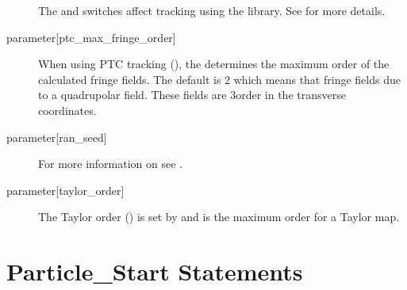 \begin{description}
The  and  switches affect tracking using the 
library. See  for more details.
%
  \item[{parameter[ptc_max_fringe_order]}] \Newline
When using PTC tracking (), the  determines
the maximum order of the calculated fringe fields. The default is 2 which means that fringe fields
due to a quadrupolar field. These fields are 3\Rd order in the transverse coordinates.
%
  \item[{parameter[ran_seed]}] \Newline
For more information on  see .
%
  \item[{parameter[taylor_order]}] \Newline
The Taylor order () is set by  and is the maximum
order for a Taylor map.
  \end{description}

\section{Particle_Start Statements} 
\label{s:beam.start}

